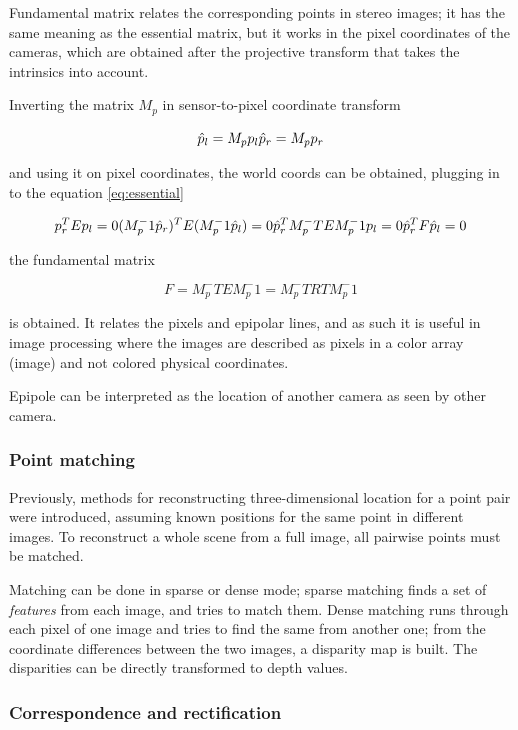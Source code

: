 Fundamental matrix relates the corresponding points in stereo images; it has the same meaning as the essential matrix, but it works in the pixel coordinates of the cameras, which are obtained after the projective transform that takes the intrinsics into account.

Inverting the matrix $M_p$ in sensor-to-pixel coordinate transform

\[
\hat p_l = M_p p_l\\
\hat p_r = M_p p_r
\]

and using it on pixel coordinates, the world coords can be obtained, plugging in to the equation \ref{eq:essential}

\[
p_r^T E p_l = 0\\
(M_p^-1 \hat p_r)^T E (M_p^-1 \hat p_l) = 0\\
\hat p_r^T M_p^-T E M_p^-1 p_l = 0\\
\hat p_r^T F \hat p_l = 0
\]

the fundamental matrix

\[
F = M_p^-T E M_p^-1 = M_p^-T R T M_p^-1
\]

is obtained. It relates the pixels and epipolar lines, and as such it is useful in image processing where the images are described as pixels in a color array (image) and not colored physical coordinates.

Epipole can be interpreted as the location of another camera as seen by other camera.

\subsubsection{Point matching}

Previously, methods for reconstructing three-dimensional location for a point pair were introduced, assuming known positions for the same point in different images.
To reconstruct a whole scene from a full image, all pairwise points must be matched.

Matching can be done in sparse or dense mode; sparse matching finds a set of \textit{features} from each image, and tries to match them. Dense matching runs through each pixel of one image and tries to find the same from another one; from the coordinate differences between the two images, a disparity map is built. The disparities can be directly transformed to depth values.


\subsubsection{Correspondence and rectification}

